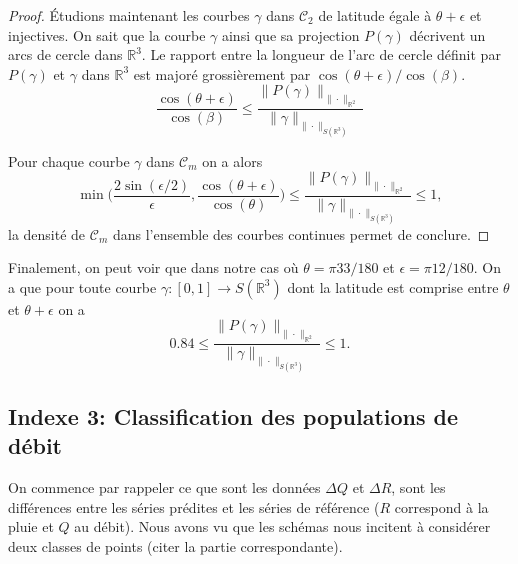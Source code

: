 \documentclass[a4paper,11pt]{article}
\begin{document}
\begin{proof}
Étudions maintenant les courbes $\gamma$ dans $\mathcal{C}_2$ de latitude égale à $\theta+\epsilon$ et injectives. On sait que la courbe $\gamma$ ainsi que sa projection $P(\gamma)$ décrivent un arcs de cercle dans $\mathbb{R}^3$. Le rapport entre la longueur de l'arc de cercle définit par $P(\gamma)$ et $\gamma$ dans $\mathbb{R}^3$ est majoré grossièrement par $\cos(\theta+\epsilon)/\cos(\beta)$.
\[\frac{\cos(\theta+\epsilon)}{\cos(\beta)}\leq\frac{\|P(\gamma)\|_{\|\cdot\|_{\mathbb{R}^2}}}{\|\gamma\|_{\|\cdot\|_{S(\mathbb{R}^3)}}}\]

Pour chaque courbe $\gamma$ dans $\mathcal{C}_m$ on a alors 
\[\min\Big(\frac{2\sin(\epsilon/2)}{\epsilon},\frac{\cos(\theta+\epsilon)}{\cos(\theta)} \Big)\leq \frac{\|P(\gamma)\|_{\|\cdot\|_{\mathbb{R}^2}}}{\|\gamma\|_{\|\cdot\|_{S(\mathbb{R}^3)}}} \leq 1,\]
la densité de $\mathcal{C}_m$ dans l'ensemble des courbes continues permet de conclure.
\end{proof}

Finalement, on peut voir que dans notre cas où $\theta=\pi 33/180$ et $\epsilon=\pi 12/180$. On a que pour toute courbe $\gamma:[0,1]\to S(\mathbb{R}^3)$ dont la latitude est comprise entre $\theta$ et $\theta+\epsilon$ on a
\[0.84\leq \frac{\|P(\gamma)\|_{\|\cdot\|_{\mathbb{R}^2}}}{\|\gamma\|_{\|\cdot\|_{S(\mathbb{R}^3)}}} \leq 1.\]

\subsection{Indexe 3: Classification des populations de débit}
\label{indexe3:cl_deb}

On commence par rappeler ce que sont les données $\Delta Q$ et $\Delta R$, sont les différences entre les séries prédites et les séries de référence ($R$ correspond à la pluie et $Q$ au débit). Nous avons vu  que les schémas nous incitent à considérer deux classes de points (citer la partie correspondante).
\end{document}
